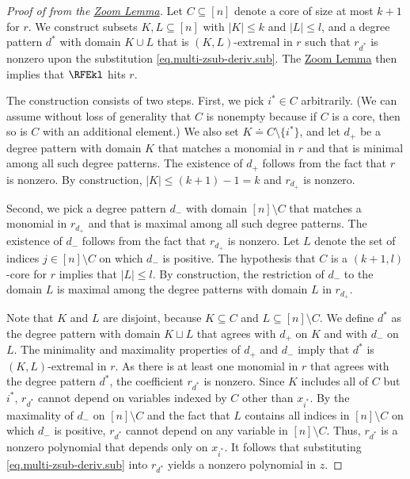\begin{proof}[Proof of  from the
  \texorpdfstring{\hyperref[lem.multi-zsub-deriv]{Zoom Lemma}}{Zoom Lemma}]
  Let \(C \subseteq [n]\) denote a core of size at most $k+1$ for \(r\).
  We construct subsets $K, L \subseteq [n]$ with $|K| \le k$ and $|L| \le l$,
  and a degree pattern $d^*$ with domain $K \cup L$ that is $(K,L)$-extremal in
  $r$ such that $r_{d^*}$ is nonzero upon the substitution 
  \eqref{eq.multi-zsub-deriv.sub}.
  The \hyperref[lem.multi-zsub-deriv]{Zoom Lemma} then implies that $\RFEkl$ hits $r$.

  The construction consists of two steps.
  First, we pick $i^*\in C$ arbitrarily. (We can assume without loss of
  generality that $C$ is nonempty because if $C$ is a core, then so is $C$ with an additional element.) 
  We also set $K \doteq C \setminus \{i^*\}$,
  and let $d_+$ be a degree pattern with domain $K$ that matches a monomial in
  $r$ and that is minimal among all such degree patterns.
  The existence of $d_+$ follows from the fact that $r$ is nonzero.
  By construction, $|K| \le (k+1)-1 = k$ and \(r_{d_+}\) is nonzero.

  Second, we pick a degree pattern $d_-$ with domain $[n]\setminus C$ that
  matches a monomial in $r_{d_+}$ and that is maximal among all such degree
  patterns.
  The existence of $d_-$ follows from the fact that $r_{d_+}$ is nonzero.
  Let $L$ denote the set of indices $j \in [n]\setminus C$ on which $d_-$ is
  positive.
  The hypothesis that $C$ is a $(k+1,l)$-core for $r$ implies that
  $|L| \le l$.
  By construction, the restriction of $d_-$ to the domain $L$ is
  maximal among the degree patterns with domain $L$ in $r_{d_+}$.

  Note that $K$ and $L$ are disjoint,
  because $K \subseteq C$ and $L \subseteq [n]\setminus C$.
  We define $d^*$ as the degree pattern with domain $K \sqcup L$ that agrees
  with $d_+$ on $K$ and with $d_-$ on $L$.
  The minimality and maximality properties of $d_+$ and $d_-$ imply that $d^*$
  is $(K,L)$-extremal in $r$.
  As there is at least one monomial in $r$ that agrees with the degree pattern $d^*$, the coefficient $r_{d^*}$ is nonzero. Since $K$ includes all of $C$ but $i^*$, $r_{d^*}$ cannot depend on variables indexed by $C$ other than $x_{i^*}$. By the maximality of $d_-$ on $[n] \setminus C$ and the fact that $L$ contains all indices in $[n] \setminus C$ on which $d_-$ is positive, $r_{d^*}$ cannot depend on any variable in $[n] \setminus C$. Thus, $r_{d^*}$ is a nonzero polynomial that depends only on
  $x_{i^*}$. It follows that
  substituting \eqref{eq.multi-zsub-deriv.sub} into $r_{d^*}$ yields a nonzero polynomial in $z$.
\end{proof}

